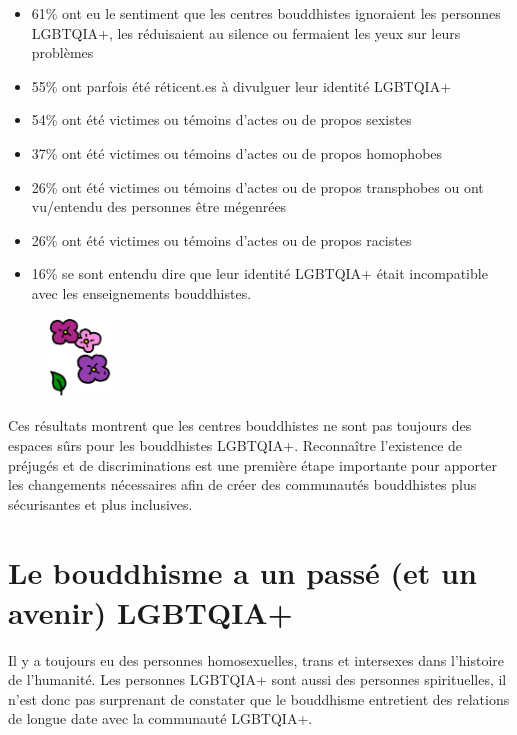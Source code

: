 \documentclass[12pt,openany]{book}
\begin{document}
\begin{itemize}[label=\textbullet, leftmargin=*]
\setlength\itemsep{-0.3em}
  \item 61\% ont eu le sentiment que les centres bouddhistes ignoraient les personnes \mbox{LGBTQIA+}, les réduisaient au silence ou fermaient les yeux sur leurs problèmes
  \item 55\% ont parfois été réticent.es à divulguer leur identité \mbox{LGBTQIA+}
  \item 54\% ont été victimes ou témoins d’actes ou de propos sexistes
  \item 37\% ont été victimes ou témoins d’actes ou de propos homophobes
  \item 26\% ont été victimes ou témoins d’actes ou de propos transphobes ou ont vu/entendu des personnes être mégenrées
  \item 26\% ont été victimes ou témoins d’actes ou de propos racistes
  \item 16\% se sont entendu dire que leur identité \mbox{LGBTQIA+} était incompatible avec les enseignements bouddhistes.
\end{itemize}

\begin{figure}
    \centering
    \includegraphics[width=0.15\textwidth]{2c4.png}
\end{figure}

Ces résultats montrent que les centres bouddhistes ne sont pas toujours des espaces sûrs pour les bouddhistes \mbox{LGBTQIA+}. Reconnaître l’existence de préjugés et de discriminations est une première étape importante pour apporter les changements nécessaires afin de créer des communautés bouddhistes plus sécurisantes et plus inclusives.

\section*{Le bouddhisme a un passé (et un avenir) \mbox{LGBTQIA+}}

\noindent Il y a toujours eu des personnes homosexuelles, trans et intersexes dans l’histoire de l’humanité. Les personnes \mbox{LGBTQIA+} sont aussi des personnes spirituelles, il n’est donc pas surprenant de constater que le bouddhisme entretient des relations de longue date avec la communauté \mbox{LGBTQIA+}.
\end{document}
